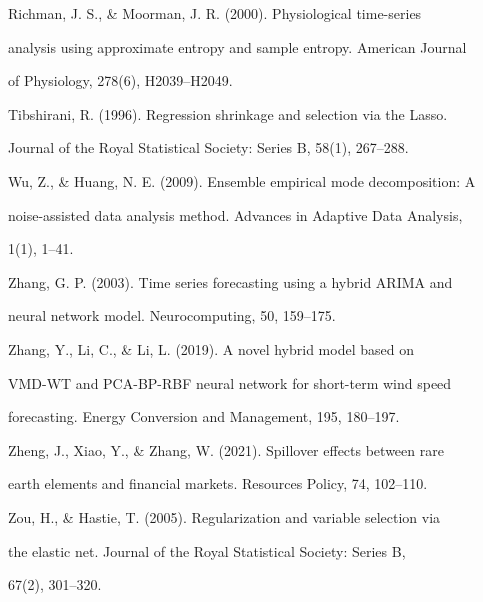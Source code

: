Richman, J. S., \& Moorman, J. R. (2000). Physiological time-series

analysis using approximate entropy and sample entropy. American Journal

of Physiology, 278(6), H2039--H2049.



Tibshirani, R. (1996). Regression shrinkage and selection via the Lasso.

Journal of the Royal Statistical Society: Series B, 58(1), 267--288.



Wu, Z., \& Huang, N. E. (2009). Ensemble empirical mode decomposition: A

noise-assisted data analysis method. Advances in Adaptive Data Analysis,

1(1), 1--41.



Zhang, G. P. (2003). Time series forecasting using a hybrid ARIMA and

neural network model. Neurocomputing, 50, 159--175.



Zhang, Y., Li, C., \& Li, L. (2019). A novel hybrid model based on

VMD-WT and PCA-BP-RBF neural network for short-term wind speed

forecasting. Energy Conversion and Management, 195, 180--197.



Zheng, J., Xiao, Y., \& Zhang, W. (2021). Spillover effects between rare

earth elements and financial markets. Resources Policy, 74, 102--110.



Zou, H., \& Hastie, T. (2005). Regularization and variable selection via

the elastic net. Journal of the Royal Statistical Society: Series B,

67(2), 301--320.

